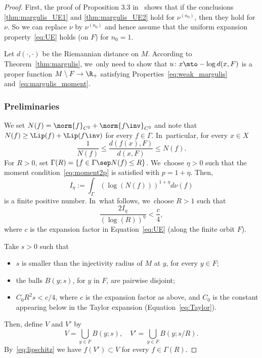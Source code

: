 \begin{proof}
First, the proof of Proposition 3.3 in~\cite{benard-desaxce} shows that if
the conclusions \eqref{thm:margulis_UE1} and \eqref{thm:margulis_UE2} hold for $\nu^{(n_0)}$, then they hold for $\nu$. So we can replace $\nu$ by $\nu^{(n_0)}$ and hence assume that the uniform expansion property~\eqref{eq:UE} holds (on $F$) for $n_0=1$.

Let $d(\cdot,\cdot)$ be the Riemannian distance on $M$. According to Theorem~\ref{thm:margulis}, we~only need to show that
$u\colon x\mto - \log d(x, F)$ is a
proper function $M\setminus F\to \R_+$ satisfying Properties~\eqref{eq:weak_margulis}
and~\eqref{eq:margulis_moment}.

\subsubsection*{Preliminaries}
We set
$N(f)=\norm{f}_{C^2}+\norm{f\inv}_{C^2}$ and note that $N(f)\geq \Lip(f) + \Lip(f\inv)$ for every $f\in \Gamma$. In~particular, for every $x\in X$
\begin{equation}
\label{eq:lipschitz}
\frac{1}{N(f)} \leq \frac{d (f(x), F)}{d(x,F)} \leq N(f).
\end{equation}
For $R>0$, set $\Gamma(R)=\{f\in \Gamma \sep  N(f) \leq R\}$. We~choose $\eta >0$ such that the moment condition~\eqref{eq:moment2p} is satisfied with $p=1+\eta$. Then,
\begin{equation*}
I_\eta:=\int_{\Gamma} \left(\log(N(f))\right)^{1+\eta} d\nu(f)
\end{equation*}
is a finite positive number. In~what follows, we~choose $R>1$ such that
\begin{equation*}
\frac{2I_\eta}{(\log(R))^\eta}< \frac{c}{4},
\end{equation*}
where $c$ is the expansion factor in Equation~\eqref{eq:UE} (along the finite orbit $F$).

Take $s>0$ such that
\begin{itemize}
\item $s$ is smaller than the injectivity radius of $M$ at $y$, for every $y\in F$;
\item the balls $B(y;s)$, for $y$ in $F$, are pairwise disjoint;
\item $C_0R^2 s < c/4$, where $c$ is the expansion factor as above, and $C_0$ is the constant appearing
below in the Taylor expansion (Equation~\eqref{eq:Taylor}).
\end{itemize}
Then, define $V$ and $V'$ by
\begin{equation*}
V=\bigcup_{y\in F} B(y;s), \quad V' = \bigcup_{y\in F} B(y;s/R).
\end{equation*}
By~\eqref{eq:lipschitz} we have $f(V')\subset V$ for every $f\in \Gamma(R)$.


\end{proof}
